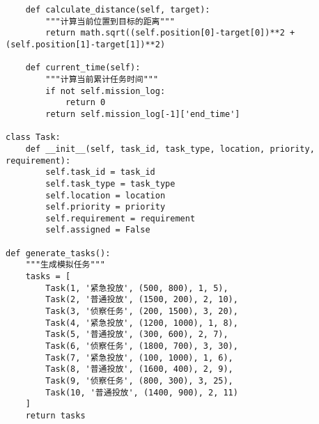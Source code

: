\documentclass[12pt,fontset=adobe]{ctexart}
\begin{document}
\begin{verbatim}
    def calculate_distance(self, target):
        """计算当前位置到目标的距离"""
        return math.sqrt((self.position[0]-target[0])**2 + (self.position[1]-target[1])**2)
    
    def current_time(self):
        """计算当前累计任务时间"""
        if not self.mission_log:
            return 0
        return self.mission_log[-1]['end_time']

class Task:
    def __init__(self, task_id, task_type, location, priority, requirement):
        self.task_id = task_id
        self.task_type = task_type
        self.location = location
        self.priority = priority
        self.requirement = requirement
        self.assigned = False

def generate_tasks():
    """生成模拟任务"""
    tasks = [
        Task(1, '紧急投放', (500, 800), 1, 5),
        Task(2, '普通投放', (1500, 200), 2, 10),
        Task(3, '侦察任务', (200, 1500), 3, 20),
        Task(4, '紧急投放', (1200, 1000), 1, 8),
        Task(5, '普通投放', (300, 600), 2, 7),
        Task(6, '侦察任务', (1800, 700), 3, 30),
        Task(7, '紧急投放', (100, 1000), 1, 6),
        Task(8, '普通投放', (1600, 400), 2, 9),
        Task(9, '侦察任务', (800, 300), 3, 25),
        Task(10, '普通投放', (1400, 900), 2, 11)
    ]
    return tasks


\end{verbatim}
\end{document}
